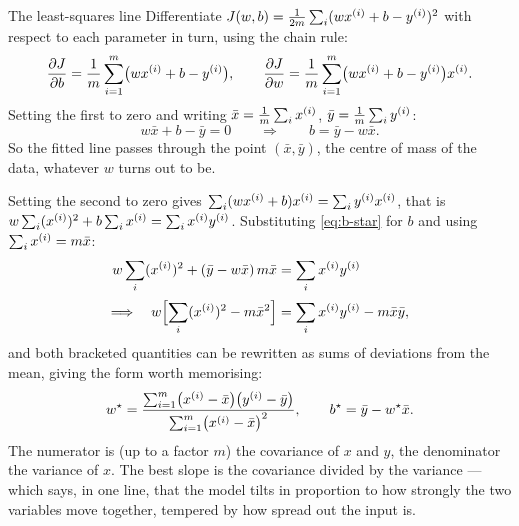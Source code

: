 \begin{derivation}{The least-squares line}
Differentiate $J(w,b) = \frac{1}{2m}\sum_i (wx^{(i)}+b-y^{(i)})^2$ with respect
to each parameter in turn, using the chain rule:
\[
  \frac{\partial J}{\partial b}
    = \frac{1}{m}\sum_{i=1}^{m}\bigl(wx^{(i)}+b-y^{(i)}\bigr),
  \qquad
  \frac{\partial J}{\partial w}
    = \frac{1}{m}\sum_{i=1}^{m}\bigl(wx^{(i)}+b-y^{(i)}\bigr)x^{(i)}.
\]
Setting the first to zero and writing $\bar x = \frac1m\sum_i x^{(i)}$,
$\bar y = \frac1m\sum_i y^{(i)}$:
\begin{equation}
  w\bar x + b - \bar y = 0
  \qquad\Longrightarrow\qquad
  b = \bar y - w\bar x .
  \label{eq:b-star}
\end{equation}
So the fitted line passes through the point $(\bar x, \bar y)$, the centre of
mass of the data, whatever $w$ turns out to be.

Setting the second to zero gives
$\sum_i (wx^{(i)}+b)x^{(i)} = \sum_i y^{(i)}x^{(i)}$, that is
$w\sum_i (x^{(i)})^2 + b\sum_i x^{(i)} = \sum_i x^{(i)}y^{(i)}$. Substituting
\cref{eq:b-star} for $b$ and using $\sum_i x^{(i)} = m\bar x$:
\[
  \begin{aligned}
    w\sum_i (x^{(i)})^{2} + (\bar y - w \bar x)\,m\bar x
      &= \sum_i x^{(i)}y^{(i)}\\[2pt]
    \Longrightarrow\quad
    w\Bigl[\sum_i (x^{(i)})^{2} - m\bar x^{2}\Bigr]
      &= \sum_i x^{(i)}y^{(i)} - m\bar x\bar y ,
  \end{aligned}
\]
and both bracketed quantities can be rewritten as sums of deviations from the
mean, giving the form worth memorising:
\begin{equation}
  w^{\star} = \frac{\sum_{i=1}^{m}\bigl(x^{(i)}-\bar x\bigr)
                        \bigl(y^{(i)}-\bar y\bigr)}
                   {\sum_{i=1}^{m}\bigl(x^{(i)}-\bar x\bigr)^{2}},
  \qquad
  b^{\star} = \bar y - w^{\star}\bar x .
  \label{eq:closed-form}
\end{equation}
The numerator is (up to a factor $m$) the covariance of $x$ and $y$, the
denominator the variance of $x$. The best slope is the covariance divided by the
variance --- which says, in one line, that the model tilts in proportion to how
strongly the two variables move together, tempered by how spread out the input
is.
\end{derivation}

